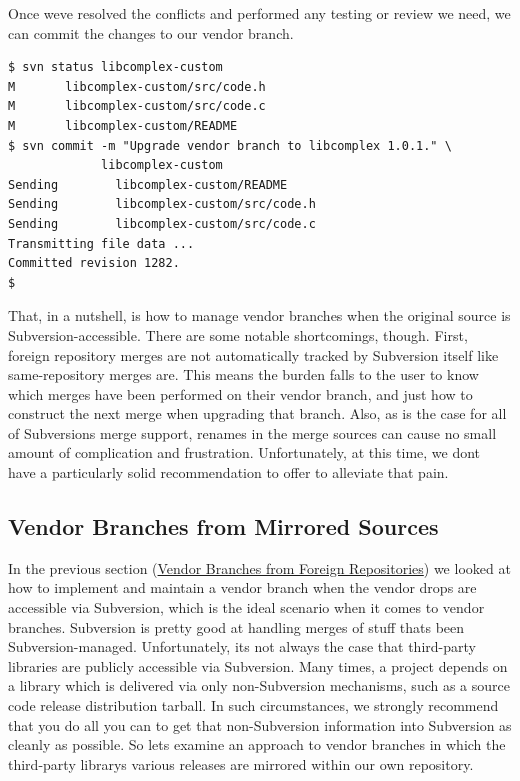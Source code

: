 Once we\textquotesingle ve resolved the conflicts and performed any
testing or review we need, we can commit the changes to our vendor
branch.

\begin{verbatim}
$ svn status libcomplex-custom
M       libcomplex-custom/src/code.h
M       libcomplex-custom/src/code.c
M       libcomplex-custom/README
$ svn commit -m "Upgrade vendor branch to libcomplex 1.0.1." \
             libcomplex-custom
Sending        libcomplex-custom/README
Sending        libcomplex-custom/src/code.h
Sending        libcomplex-custom/src/code.c
Transmitting file data ...
Committed revision 1282.
$
\end{verbatim}

That, in a nutshell, is how to manage vendor branches when the original
source is Subversion-accessible. There are some notable shortcomings,
though. First, foreign repository merges are not automatically tracked
by Subversion itself like same-repository merges are. This means the
burden falls to the user to know which merges have been performed on
their vendor branch, and just how to construct the next merge when
upgrading that branch. Also, as is the case for all of
Subversion\textquotesingle s merge support, renames in the merge sources
can cause no small amount of complication and frustration.
Unfortunately, at this time, we don\textquotesingle t have a
particularly solid recommendation to offer to alleviate that pain.

\subsection{Vendor Branches from Mirrored
Sources}\label{svn.advanced.vendorbr.mirrored-sources}

In the previous section
(\hyperref[svn.advanced.vendorbr.foreign-repos]{Vendor Branches from
Foreign Repositories}) we looked at how to implement and maintain a
vendor branch when the vendor drops are accessible via Subversion, which
is the ideal scenario when it comes to vendor branches. Subversion is
pretty good at handling merges of stuff that\textquotesingle s been
Subversion-managed. Unfortunately, it\textquotesingle s not always the
case that third-party libraries are publicly accessible via Subversion.
Many times, a project depends on a library which is delivered via only
non-Subversion mechanisms, such as a source code release distribution
tarball. In such circumstances, we strongly recommend that you do all
you can to get that non-Subversion information into Subversion as
cleanly as possible. So let\textquotesingle s examine an approach to
vendor branches in which the third-party library\textquotesingle s
various releases are mirrored within our own repository.

